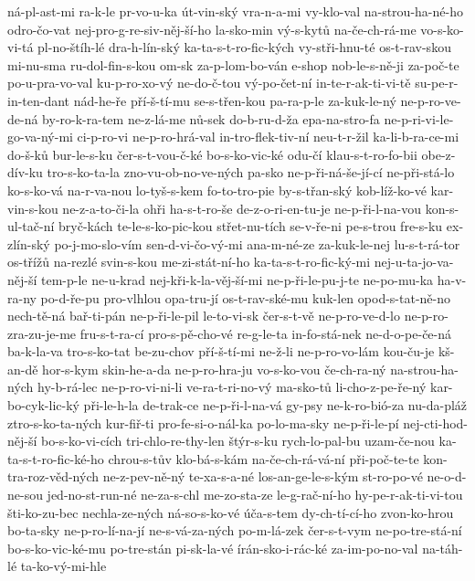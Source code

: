 ná-pl-ast-mi
ra-k-le
pr-vo-u-ka
út-vin-ský
vra-n-a-mi
vy-klo-val
na-strou-ha-né-ho
odro-čo-vat
nej-pro-g-re-siv-něj-ší-ho
la-sko-min
vý-s-kytů
na-če-ch-rá-me
vo-s-ko-vi-tá
pl-no-štíh-lé
dra-h-lín-ský
ka-ta-s-t-ro-fic-kých
vy-stři-hnu-té
os-t-rav-skou
mi-nu-sma
ru-dol-fin-s-kou
om-sk
za-p-lom-bo-ván
e-shop
nob-le-s-ně-ji
za-poč-te
po-u-pra-vo-val
ku-p-ro-xo-vý
ne-do-č-tou
vý-po-čet-ní
in-te-r-ak-ti-vi-tě
su-pe-r-in-ten-dant
nád-he-ře
pří-š-tí-mu
se-s-třen-kou
pa-ra-p-le
za-kuk-le-ný
ne-p-ro-ve-de-ná
by-ro-k-ra-tem
ne-z-lá-me
nů-sek
do-b-ru-d-ža
epa-na-stro-fa
ne-p-ri-vi-le-go-va-ný-mi
ci-p-ro-vi
ne-p-ro-hrá-val
in-tro-flek-tiv-ní
neu-t-r-žil
ka-li-b-ra-ce-mi
do-š-ků
bur-le-s-ku
čer-s-t-vou-č-ké
bo-s-ko-vic-ké
odu-čí
klau-s-t-ro-fo-bii
obe-z-dív-ku
tro-s-ko-ta-la
zno-vu-ob-no-ve-ných
pa-sko
ne-p-ři-ná-še-jí-cí
ne-při-stá-lo
ko-s-ko-vá
na-r-va-nou
lo-tyš-s-kem
fo-to-tro-pie
by-s-třan-ský
kob-líž-ko-vé
kar-vin-s-kou
ne-z-a-to-či-la
ohři
ha-s-t-ro-še
de-z-o-ri-en-tu-je
ne-p-ři-l-na-vou
kon-s-ul-tač-ní
bryč-kách
te-le-s-ko-pic-kou
střet-nu-tích
se-v-ře-ni
pe-s-trou
fre-s-ku
ex-zlín-ský
po-j-mo-slo-vím
sen-d-vi-čo-vý-mi
ana-m-né-ze
za-kuk-le-nej
lu-s-t-rá-tor
os-třížů
na-rezlé
svin-s-kou
me-zi-stát-ní-ho
ka-ta-s-t-ro-fic-ký-mi
nej-u-ta-jo-va-něj-ší
tem-p-le
ne-u-krad
nej-kři-k-la-věj-ší-mi
ne-p-ři-le-pu-j-te
ne-po-mu-ka
ha-v-ra-ny
po-d-ře-pu
pro-vlhlou
opa-tru-jí
os-t-rav-ské-mu
kuk-len
opod-s-tat-ně-no
nech-tě-ná
bař-ti-pán
ne-p-ři-le-pil
le-to-vi-sk
čer-s-t-vě
ne-p-ro-ve-d-lo
ne-p-ro-zra-zu-je-me
fru-s-t-ra-cí
pro-s-pě-cho-vé
re-g-le-ta
in-fo-stá-nek
ne-d-o-pe-če-ná
ba-k-la-va
tro-s-ko-tat
be-zu-chov
pří-š-tí-mi
ne-ž-li
ne-p-ro-vo-lám
kou-ču-je
kš-an-dě
hor-s-kym
skin-he-a-da
ne-p-ro-hra-ju
vo-s-ko-vou
če-ch-ra-ný
na-strou-ha-ných
hy-b-rá-lec
ne-p-ro-vi-ni-li
ve-ra-t-ri-no-vý
ma-sko-tů
li-cho-z-pe-ře-ný
kar-bo-cyk-lic-ký
při-le-h-la
de-trak-ce
ne-p-ři-l-na-vá
gy-psy
ne-k-ro-bió-za
nu-da-pláž
ztro-s-ko-ta-ných
kur-fiř-ti
pro-fe-si-o-nál-ka
po-lo-ma-sky
ne-p-ři-le-pí
nej-cti-hod-něj-ší
bo-s-ko-vi-cích
tri-chlo-re-thy-len
štýr-s-ku
rych-lo-pal-bu
uzam-če-nou
ka-ta-s-t-ro-fic-ké-ho
chrou-s-tův
klo-bá-s-kám
na-če-ch-rá-vá-ní
při-poč-te-te
kon-tra-roz-věd-ných
ne-z-pev-ně-ný
te-xa-s-a-né
los-an-ge-le-s-kým
st-ro-po-vé
ne-o-d-ne-sou
jed-no-st-run-né
ne-za-s-chl
me-zo-sta-ze
le-g-rač-ní-ho
hy-pe-r-ak-ti-vi-tou
šti-ko-zu-bec
nechla-ze-ných
ná-so-s-ko-vé
úča-s-tem
dy-ch-tí-cí-ho
zvon-ko-hrou
bo-ta-sky
ne-p-ro-lí-na-jí
ne-s-vá-za-ných
po-m-lá-zek
čer-s-t-vym
ne-po-tre-stá-ní
bo-s-ko-vic-ké-mu
po-tre-stán
pi-sk-la-vé
írán-sko-i-rác-ké
za-im-po-no-val
na-táh-lé
ta-ko-vý-mi-hle
